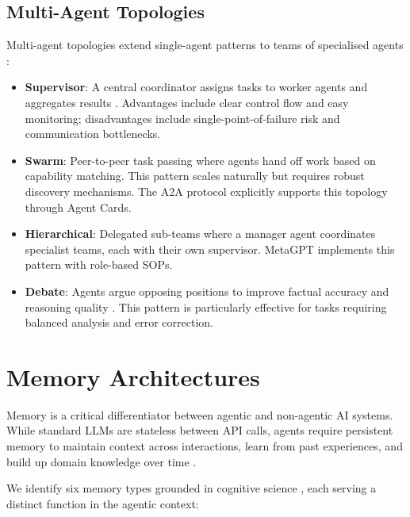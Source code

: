 \documentclass[review,authoryear]{elsarticle}
\theoremstyle{definition}
\begin{document}
\subsection{Multi-Agent Topologies}

Multi-agent topologies extend single-agent patterns to teams of specialised agents \citep{guo2024large,talebirad2023multiagent}:

\begin{itemize}
    \item \textbf{Supervisor}: A central coordinator assigns tasks to worker agents and aggregates results \citep{wu2023autogen}. Advantages include clear control flow and easy monitoring; disadvantages include single-point-of-failure risk and communication bottlenecks.
    \item \textbf{Swarm}: Peer-to-peer task passing where agents hand off work based on capability matching. This pattern scales naturally but requires robust discovery mechanisms. The A2A protocol \citep{google2024a2a} explicitly supports this topology through Agent Cards.
    \item \textbf{Hierarchical}: Delegated sub-teams where a manager agent coordinates specialist teams, each with their own supervisor. MetaGPT \citep{hong2023metagpt} implements this pattern with role-based SOPs.
    \item \textbf{Debate}: Agents argue opposing positions to improve factual accuracy and reasoning quality \citep{du2023improving,chan2024chateval}. This pattern is particularly effective for tasks requiring balanced analysis and error correction.
\end{itemize}

\section{Memory Architectures}\label{sec:memory}

Memory is a critical differentiator between agentic and non-agentic AI systems. While standard LLMs are stateless between API calls, agents require persistent memory to maintain context across interactions, learn from past experiences, and build up domain knowledge over time \citep{zhang2024survey_memory}.

We identify six memory types grounded in cognitive science \citep{sumers2024cognitive}, each serving a distinct function in the agentic context:
\end{document}
